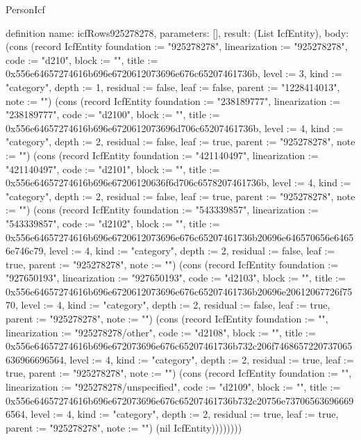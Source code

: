 \begin{lexlean}{PersonIcf}
\begin{semanticmodule}
definition{
  name: icfRows925278278,
  parameters: [],
  result: (List IcfEntity),
  body: (cons (record IcfEntity {foundation := "925278278", linearization := "925278278", code := "d210", block := "", title := 0x556e64657274616b696e6720612073696e676c65207461736b, level := 3, kind := "category", depth := 1, residual := false, leaf := false, parent := "1228414013", note := ""}) (cons (record IcfEntity {foundation := "238189777", linearization := "238189777", code := "d2100", block := "", title := 0x556e64657274616b696e6720612073696d706c65207461736b, level := 4, kind := "category", depth := 2, residual := false, leaf := true, parent := "925278278", note := ""}) (cons (record IcfEntity {foundation := "421140497", linearization := "421140497", code := "d2101", block := "", title := 0x556e64657274616b696e67206120636f6d706c6578207461736b, level := 4, kind := "category", depth := 2, residual := false, leaf := true, parent := "925278278", note := ""}) (cons (record IcfEntity {foundation := "543339857", linearization := "543339857", code := "d2102", block := "", title := 0x556e64657274616b696e6720612073696e676c65207461736b20696e646570656e64656e746c79, level := 4, kind := "category", depth := 2, residual := false, leaf := true, parent := "925278278", note := ""}) (cons (record IcfEntity {foundation := "927650193", linearization := "927650193", code := "d2103", block := "", title := 0x556e64657274616b696e6720612073696e676c65207461736b20696e20612067726f7570, level := 4, kind := "category", depth := 2, residual := false, leaf := true, parent := "925278278", note := ""}) (cons (record IcfEntity {foundation := "", linearization := "925278278/other", code := "d2108", block := "", title := 0x556e64657274616b696e672073696e676c65207461736b732c206f7468657220737065636966696564, level := 4, kind := "category", depth := 2, residual := true, leaf := true, parent := "925278278", note := ""}) (cons (record IcfEntity {foundation := "", linearization := "925278278/unspecified", code := "d2109", block := "", title := 0x556e64657274616b696e672073696e676c65207461736b732c20756e737065636966696564, level := 4, kind := "category", depth := 2, residual := true, leaf := true, parent := "925278278", note := ""}) (nil IcfEntity))))))))
}


\end{semanticmodule}
\end{lexlean}
